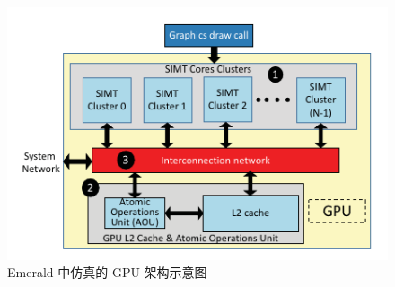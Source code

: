 \begin{figure}
    \centering
    \includegraphics{figures/emerald_gpu_arch.pdf}
    \caption{Emerald 中仿真的 GPU 架构示意图\cite{10.1145/3307650.3322221}}
    \label{fig:emerald_gpu_arch}
\end{figure}

